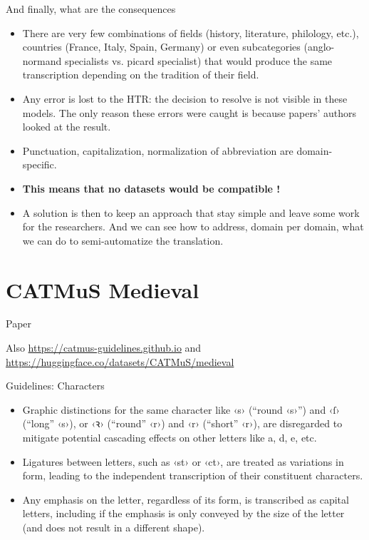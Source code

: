 \documentclass[aspectratio=169]{beamer}
\newcommand{\juni}[1]{{\junicodeFont #1}}
\newcommand{\character}[1]{{‹#1›}}
\begin{document}
\begin{frame}{And finally, what are the consequences}
    \begin{itemize}
        \item There are very few combinations of fields (history, literature, philology, etc.), countries (France, Italy, Spain, Germany) or even subcategories (anglo-normand specialists vs. picard specialist) that would produce the same transcription depending on the tradition of their field.
        \item Any error is lost to the HTR: the decision to resolve is not visible in these models. The only reason these errors were caught is because papers' authors looked at the result.
        \item Punctuation, capitalization, normalization of abbreviation are domain-specific.
        \item<2> \textbf{This means that no datasets would be compatible !}
        \item<2> A solution is then to keep an approach that stay simple and leave some work for the researchers. And we can see how to address, domain per domain, what we can do to semi-automatize the translation.
    \end{itemize}
\end{frame}


\section{CATMuS Medieval}

\begin{frame}{Paper}

    Also \url{https://catmus-guidelines.github.io} and \url{https://huggingface.co/datasets/CATMuS/medieval}
\end{frame}

\begin{frame}{Guidelines: Characters}
    \begin{itemize}
        \item Graphic distinctions for the same character like \character{s} (\enquote{round \character{s}}) and \character{ſ} (\enquote{long} \character{s}), or \character{\juni{ꝛ}} (\enquote{round} \character{r}) and \character{r} (\enquote{short} \character{r}), are disregarded to mitigate potential cascading effects on other letters like a, d, e, etc.
        \item Ligatures between letters, such as \character{st} or \character{ct}, are treated as variations in form, leading to the independent transcription of their constituent characters.
        \item Any emphasis on the letter, regardless of its form, is transcribed as capital letters, including if the emphasis is only conveyed by the size of the letter (and does not result in a different shape).
    \end{itemize}
\end{frame}
\end{document}
